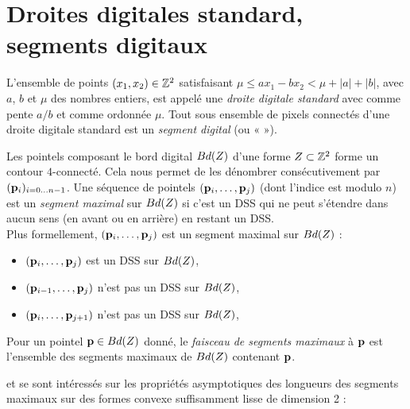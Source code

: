 \section{Droites digitales standard, segments digitaux}%
\label{sec:segments}
%
\begin{definition}
  \label{def:DSS}
%
  L'ensemble de points $(x_1,x_2) \in \mathbb{Z}^2$ satisfaisant $\mu \le ax_1 - bx_2 <
  \mu + |a| + |b|$, avec $a$, $b$ et $\mu$ des nombres entiers, est appelé une
  \emph{droite digitale standard} avec comme pente $a/b$ et comme ordonnée
  $\mu$. Tout sous ensemble de pixels connectés d'une droite digitale standard
  est un \emph{segment digital} (ou «  »).
%
\end{definition}
%
\begin{definition}
  \label{def:MDSS}
%
  Les pointels composant le bord digital $Bd({Z})$ d'une forme
  $Z \subset \mathbb{Z}^2$ forme un contour $4$-connecté. Cela nous permet de
  les dénombrer consécutivement par $(\mathbf{p}_i)_{i={0\ldots n-1}}$. Une séquence de
  pointels $(\mathbf{p}_i, \ldots, \mathbf{p}_j)$ (dont l'indice est modulo $n$) est un
  \emph{segment maximal} sur $Bd({Z})$ si c'est un DSS qui ne peut
  s'étendre dans aucun sens (en avant ou en arrière) en restant un DSS.
  \\
  Plus formellement, $(\mathbf{p}_i, \ldots, \mathbf{p}_j)$ est un segment maximal sur $Bd({Z})$ \ssi :
  \begin{itemize}
    \item $(\mathbf{p}_i, \ldots, \mathbf{p}_j)$ est un DSS sur $Bd({Z})$,
    \item $(\mathbf{p}_{i-1}, \ldots, \mathbf{p}_j)$ n'est pas un DSS sur $Bd({Z})$,
    \item $(\mathbf{p}_i, \ldots, \mathbf{p}_{j+1})$ n'est pas un DSS sur $Bd({Z})$,
  \end{itemize}
  Pour un pointel $\mathbf{p} \in Bd({Z})$ donné, le \emph{faisceau de segments maximaux} à $\mathbf{p}$ est l'ensemble
  des segments maximaux de $Bd({Z})$ contenant $\mathbf{p}$.
%
\end{definition}
%
 et  se sont intéressés sur les propriétés
asymptotiques des longueurs des segments maximaux sur des formes convexe
suffisamment lisse de dimension 2 :
%
